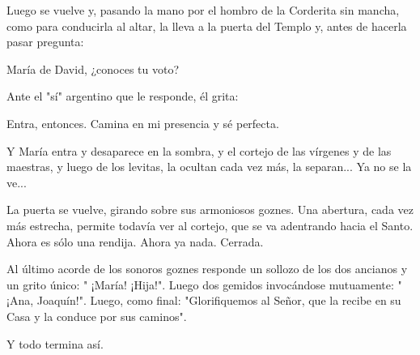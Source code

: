 \documentclass[12pt]{book} %
\begin{document}
Luego se vuelve y, pasando la mano por el hombro de la Corderita sin mancha, como para conducirla al altar, la lleva a la puerta del Templo y, antes de hacerla pasar pregunta: 

María de David, ¿conoces tu voto? 

Ante el "sí" argentino que le responde, él grita: 

Entra, entonces. Camina en mi presencia y sé perfecta. 

Y María entra y desaparece en la sombra, y el cortejo de las vírgenes y de las maestras, y luego de los levitas, la ocultan cada vez más, la separan... Ya no se la ve... 

La puerta se vuelve, girando sobre sus armoniosos goznes. Una abertura, cada vez más estrecha, permite todavía ver al cortejo, que se va adentrando hacia el Santo. Ahora es sólo una rendija. Ahora ya nada. Cerrada. 

Al último acorde de los sonoros goznes responde un sollozo de los dos ancianos y un grito único: " ¡María! ¡Hija!". Luego dos gemidos invocándose mutuamente: " ¡Ana, Joaquín!". Luego, como final: "Glorifiquemos al Señor, que la recibe en su Casa y la conduce por sus caminos". 

Y todo termina así. 
\end{document}
